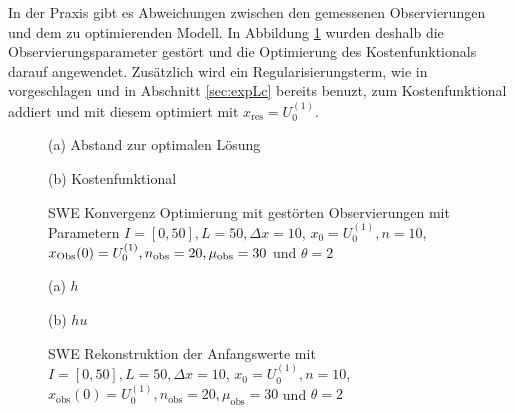 In der Praxis gibt es Abweichungen zwischen den gemessenen Observierungen und dem zu optimierenden Modell. In Abbildung \ref{fig:sweConvergenceOptNoise} wurden deshalb die Observierungsparameter gestört und die Optimierung des Kostenfunktionals darauf angewendet. Zusätzlich wird ein Regularisierungsterm, wie in \cite[S.2]{korotaev2008retrieving} vorgeschlagen und in Abschnitt \ref{sec:expLc} bereits benuzt, zum Kostenfunktional addiert und mit diesem optimiert mit $x_{\text{res}} = U_0^{(1)}$.
\begin{figure}[H]
\centering
\begin{minipage}[b]{0.49\linewidth}
 \centering

\caption*{(a) Abstand zur optimalen Lösung}
\end{minipage}
\begin{minipage}[b]{0.49\linewidth}
 \centering

\caption*{(b) Kostenfunktional}
\end{minipage}
\caption{SWE Konvergenz Optimierung mit gestörten Observierungen mit Parametern $I=[0,50],L=50,\Delta x=10$, $x_0=U_0^{(1)},n=10$, $x_{\text{Obs}}(0) = U_0^{(1)}, n_{\text{obs}}=20,\mu_{\text{obs}}=30$ und $\theta=2$}
\label{fig:sweConvergenceOptNoise}
\end{figure}
\begin{figure}[H]
\begin{minipage}[b]{0.49\linewidth}
\centering

\caption*{(a) $h$}
\end{minipage}
\begin{minipage}[b]{0.49\linewidth}
\centering

\caption*{(b) $hu$}
\end{minipage}
\caption{SWE Rekonstruktion der Anfangswerte mit $I=[0,50],L=50,\Delta x=10$, $x_0=U_0^{(1)},n=10$, $x_{\text{obs}}(0) = U_0^{(1)}, n_{\text{obs}}=20,\mu_{\text{obs}}=30$ und $\theta=2$}
\label{fig:sweOptInitValues}
\end{figure}

